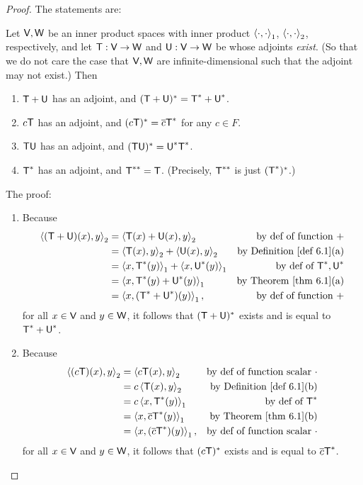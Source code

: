 \begin{proof}
The statements are:

Let \(\textsf{V}, \textsf{W}\) be an inner product spaces with inner product \(\left< \cdot, \cdot \right>_1\), \(\left< \cdot, \cdot \right>_2\), respectively, and let \(\textsf{T} : \textsf{V} \to \textsf{W}\) and \(\textsf{U} : \textsf{V} \to \textsf{W}\) be \LTRAN{} whose adjoints \emph{exist}.
(So that we do not care the case that \(\textsf{V}, \textsf{W}\) are infinite-dimensional such that the adjoint may not exist.)
Then
\begin{enumerate}
\item \(\textsf{T} + \textsf{U}\) has an adjoint, and \((\textsf{T} + \textsf{U})^* = \textsf{T}^* + \textsf{U}^*\).
\item \(c\textsf{T}\) has an adjoint, and \((c\textsf{T})^* = \overline{c}\textsf{T}^*\) for any \(c \in F\).
\item \(\textsf{T}\textsf{U}\) has an adjoint, and \((\textsf{T}\textsf{U})^* = \textsf{U}^*\textsf{T}^*\).
\item \(\textsf{T}^*\) has an adjoint, and \(\textsf{T}^{**} = \textsf{T}\).
(Precisely, \(\textsf{T}^{**}\) is just \((\textsf{T}^*)^*\).)
\end{enumerate}

The proof:

\begin{enumerate}
\item Because
\begin{align*}
    \LG (\T + \U)(x), y \RG_2
        & = \LG \T(x) + \U(x), y \RG_2 & \text{by def of function \(+\)} \\
        & = \LG \T(x), y \RG_2 + \LG \U(x), y \RG_2 & \text{by \DEF{6.1}(a)} \\
        & = \LG x, \T^*(y) \RG_1 + \LG x, \U^*(y) \RG_1 & \text{by def of \(\T^*, \U^*\)} \\
        & = \LG x, \T^*(y) + \U^*(y) \RG_1 & \text{by \THM{6.1}(a)} \\
        & = \LG x, (\T^* + \U^*)(y) \RG_1, & \text{by def of function \(+\)}
\end{align*}
for all \(x \in \textsf{V}\) and \(y \in \textsf{W}\), it follows that \((\textsf{T} + \textsf{U})^*\) exists and is equal to \(\textsf{T}^* + \textsf{U}^*\).    

\item Because
\begin{align*}
    \LG (c\T)(x), y \RG_2
        & = \LG c\T(x), y \RG_2 & \text{by def of function scalar \(\cdot\)} \\
        & = c\LG \T(x), y \RG_2 & \text{by \DEF{6.1}(b)} \\
        & = c\LG x, \T^*(y) \RG_1 & \text{by def of \(\T^*\)} \\
        & = \LG x, \conjugatet{c}\T^*(y) \RG_1 & \text{by \THM{6.1}(b)} \\
        & = \LG x, (\conjugatet{c}\T^*)(y) \RG_1, & \text{by def of function scalar \(\cdot\)}
\end{align*}
for all \(x \in \textsf{V}\) and \(y \in \textsf{W}\), it follows that \((c\textsf{T})^*\) exists and is equal to \(\overline{c}\textsf{T}^*\). 


\end{enumerate}
\end{proof}
